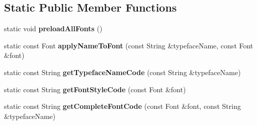 \subsection*{Static Public Member Functions}
\begin{DoxyCompactItemize}
\item 
\hypertarget{class_font_property_component_a433c79a35b89d5c333e39219bec49afe}{static void {\bfseries preload\-All\-Fonts} ()}\label{class_font_property_component_a433c79a35b89d5c333e39219bec49afe}

\item 
\hypertarget{class_font_property_component_a22427cbec8c6b15fa3ee586fdcfcb113}{static const Font {\bfseries apply\-Name\-To\-Font} (const String \&typeface\-Name, const Font \&font)}\label{class_font_property_component_a22427cbec8c6b15fa3ee586fdcfcb113}

\item 
\hypertarget{class_font_property_component_ad2f0ebaab2d6c0d736541ef30a062f51}{static const String {\bfseries get\-Typeface\-Name\-Code} (const String \&typeface\-Name)}\label{class_font_property_component_ad2f0ebaab2d6c0d736541ef30a062f51}

\item 
\hypertarget{class_font_property_component_aefaf8dd5558151e98958edb83a0b57c2}{static const String {\bfseries get\-Font\-Style\-Code} (const Font \&font)}\label{class_font_property_component_aefaf8dd5558151e98958edb83a0b57c2}

\item 
\hypertarget{class_font_property_component_a2f77cd1095c970f5497026d28f1656a4}{static const String {\bfseries get\-Complete\-Font\-Code} (const Font \&font, const String \&typeface\-Name)}\label{class_font_property_component_a2f77cd1095c970f5497026d28f1656a4}

\end{DoxyCompactItemize}
